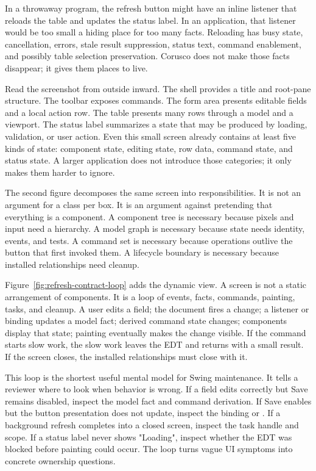 In a throwaway program, the refresh button might have an inline listener that reloads the table and updates the status label. In an application, that listener would be too small a hiding place for too many facts. Reloading has busy state, cancellation, errors, stale result suppression, status text, command enablement, and possibly table selection preservation. Corusco does not make those facts disappear; it gives them places to live.

Read the screenshot from outside inward. The shell provides a title and root-pane structure. The toolbar exposes commands. The form area presents editable fields and a local action row. The table presents many rows through a model and a viewport. The status label summarizes a state that may be produced by loading, validation, or user action. Even this small screen already contains at least five kinds of state: component state, editing state, row data, command state, and status state. A larger application does not introduce those categories; it only makes them harder to ignore.

The second figure decomposes the same screen into responsibilities. It is not an argument for a class per box. It is an argument against pretending that everything is a component. A component tree is necessary because pixels and input need a hierarchy. A model graph is necessary because state needs identity, events, and tests. A command set is necessary because operations outlive the button that first invoked them. A lifecycle boundary is necessary because installed relationships need cleanup.

Figure~\ref{fig:refresh-contract-loop} adds the dynamic view. A screen is not a
static arrangement of components. It is a loop of events, facts, commands,
painting, tasks, and cleanup. A user edits a field; the document fires a
change; a listener or binding updates a model fact; derived command state
changes; components display that state; painting eventually makes the change
visible. If the command starts slow work, the slow work leaves the EDT and
returns with a small result. If the screen closes, the installed relationships
must close with it.

This loop is the shortest useful mental model for Swing maintenance. It tells a
reviewer where to look when behavior is wrong. If a field edits correctly but
Save remains disabled, inspect the model fact and command derivation. If Save
enables but the button presentation does not update, inspect the binding or
. If a background refresh completes into a closed screen, inspect
the task handle and scope. If a status label never shows "Loading", inspect
whether the EDT was blocked before painting could occur. The loop turns vague
UI symptoms into concrete ownership questions.

